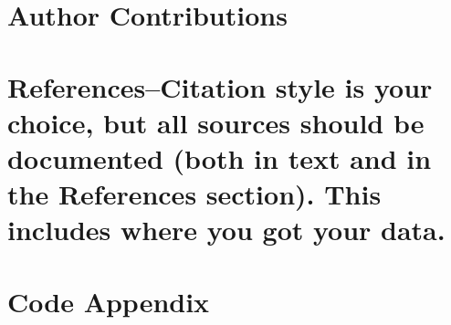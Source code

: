 \documentclass[
]{article}
\begin{document}
\hypertarget{author-contributions}{%
\section{Author Contributions}\label{author-contributions}}

\hypertarget{referencescitation-style-is-your-choice-but-all-sources-should-be-documented-both-in-text-and-in-the-references-section.-this-includes-where-you-got-your-data.}{%
\section{References--Citation style is your choice, but all sources
should be documented (both in text and in the References section). This
includes where you got your
data.}\label{referencescitation-style-is-your-choice-but-all-sources-should-be-documented-both-in-text-and-in-the-references-section.-this-includes-where-you-got-your-data.}}

\hypertarget{code-appendix}{%
\section{Code Appendix}\label{code-appendix}}
\end{document}
